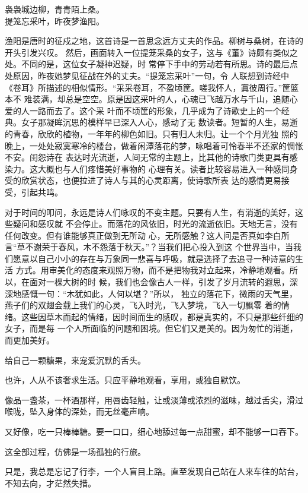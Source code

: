 		\shortpoem{}{}{}
			袅袅城边柳，青青陌上桑。\\
			提笼忘采叶，昨夜梦渔阳。\\
		\endshortpoem

		渔阳是唐时的征戍之地，这首诗是一首思念远方丈夫的作品。柳树与桑树，在诗的开头引发兴叹。
	然后，画面转入一位提笼采桑的女子，这与《董》诗颇有类似之处。不同的是，这位女子凝神迟疑，时
	常停下手中的劳动若有所思。诗的最后点处原因，昨夜她梦见征战在外的丈夫。“提笼忘采叶”一句，令
	人联想到诗经中《卷耳》所描述的相似情形。“采采卷耳，不盈顷筐。嗟我怀人，寘彼周行。”筐篮本不
	难装满，却总是空空。原是因这采叶的人，心魂已飞越万水与千山，追随心爱的人一路而去了。这个采
	叶而不顷筐的形象，几乎成为了诗歌史上的一个经典。女子那凝眸沉思的模样早已深入人心，感动了无
	数读者。短暂的人生，易逝的青春，欣欣的植物，一年年的柳色如旧。只有归人未归。让一个个月光独
	照的晚上，一处处寂寞寒冷的楼台，做着闲潭落花的梦，咏唱着可怜春半不还家的惆怅不安。闺怨诗在
	表达时光流逝，人间无常的主题上，比其他的诗歌门类更具有感染力。这大概也与人们疼惜美好事物的
	心理有关。读者比较容易进入一种感同身受的欣赏状态，也便拉进了诗人与其的心灵距离，使诗歌所表
	达的感情更易接受，引起共鸣。

		对于时间的叩问，永远是诗人们咏叹的不变主题。只要有人生，有消逝的美好，这些疑问和感叹就
	不会停止。而落花的风依旧，时光的流逝依旧。天地无言，没有任何改变。但有谁能够真正做到无所动
	心，无所感触？这人间是否真如李白所言“草不谢荣于春风，木不怨落于秋天。”？当我们把心投入到这
	个世界当中，当我们愿意以自己小小的存在与万象同一悲喜与呼吸，就是选择了去追寻一种诗意的生活
	方式。用审美化的态度来观照万物，而不是把物我对立起来，冷静地观看。所以，在面对一棵大树的时
	候，我们也会像古人一样，引发了岁月流转的遐思，深深地感慨一句：“木犹如此，人何以堪？”所以，
	独立的落花下，微雨的天气里，燕子们的双翅会载上我们的心灵，飞入时光，飞入梦境，飞入一切飘零
	着的情绪。这些因草木而起的情绪，因时间而生的感叹，都是真实的，不只是那些纤细的女子，而是每
	一个人所面临的问题和困境。但它们又是美的。因为匆忙的消逝，而更加美好。

	\endwriting



		给自己一颗糖果，来宠爱沉默的舌头。

		\vspace{1em}
		也许，人从不该奢求生活。只应平静地观看，享用，或独自默饮。\par
		像品一盏茶，一杯酒那样，用唇齿轻触，让或淡薄或浓烈的滋味，越过舌尖，滑过喉咙，坠入身体的深处，而无丝毫声响。\par
		又好像，吃一只棒棒糖。要一口口，细心地舔过每一点甜蜜，却不能够一口吞下。\par
		这全部过程，仿佛是一场孤独的行旅。\par
		只是，我总是忘记了行李，一个人盲目上路。直至发现自己站在人来车往的站台，不知去向，才茫然失措。

